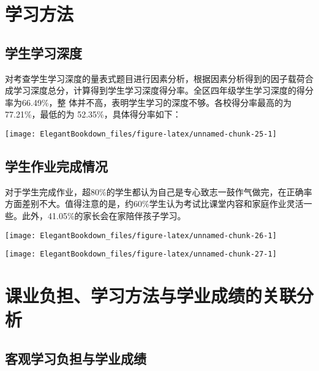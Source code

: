 \documentclass[cn, 11pt, fancy, hide]{elegantbook}
\begin{document}
\cleardoublepage

\hypertarget{section-6}{%
\section{学习方法}\label{section-6}}

\hypertarget{section-7}{%
\subsection{学生学习深度}\label{section-7}}

对考查学生学习深度的量表式题目进行因素分析，根据因素分析得到的因子载荷合成学习深度总分，计算得到学生学习深度得分率。全区四年级学生学习深度的得分率为66.49\%，整
体并不高，表明学生学习的深度不够。各校得分率最高的为 77.21\%，最低的为 52.35\%，具体得分率如下：

\begin{center}\texttt{[image: ElegantBookdown\_files/figure-latex/unnamed-chunk-25-1]} \end{center}

\hypertarget{section-8}{%
\subsection{学生作业完成情况}\label{section-8}}

对于学生完成作业，超80\%的学生都认为自己是专心致志一鼓作气做完，在正确率方面差别不大。值得注意的是，约60\%学生认为考试比课堂内容和家庭作业灵活一些。此外，41.05\%的家长会在家陪伴孩子学习。

\begin{center}\texttt{[image: ElegantBookdown\_files/figure-latex/unnamed-chunk-26-1]} \end{center}

\begin{center}\texttt{[image: ElegantBookdown\_files/figure-latex/unnamed-chunk-27-1]} \end{center}

\hypertarget{section-9}{%
\section{课业负担、学习方法与学业成绩的关联分析}\label{section-9}}

\hypertarget{section-10}{%
\subsection{客观学习负担与学业成绩}\label{section-10}}
\end{document}
